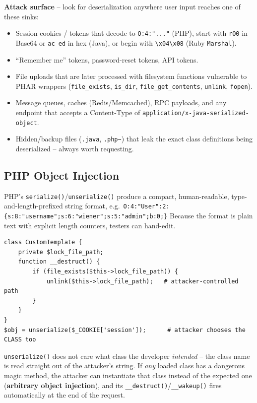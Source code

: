 \documentclass[11pt]{article}
\begin{document}
\textbf{Attack surface} -- look for deserialization anywhere user input reaches one of these sinks:
\begin{itemize}
    \item Session cookies / tokens that decode to \verb|O:4:"..."| (PHP), start with \texttt{rO0} in Base64 or \texttt{ac ed} in hex (Java), or begin with \verb|\x04\x08| (Ruby \texttt{Marshal}).
    \item ``Remember me'' tokens, password-reset tokens, API tokens.
    \item File uploads that are later processed with filesystem functions vulnerable to PHAR wrappers (\texttt{file\_exists}, \texttt{is\_dir}, \texttt{file\_get\_contents}, \texttt{unlink}, \texttt{fopen}).
    \item Message queues, caches (Redis/Memcached), RPC payloads, and any endpoint that accepts a Content-Type of \texttt{application/x-java-serialized-object}.
    \item Hidden/backup files (\texttt{.java}, \texttt{.php\~{}}) that leak the exact class definitions being deserialized -- always worth requesting.
\end{itemize}

\subsection{PHP Object Injection}
PHP's \verb|serialize()|/\verb|unserialize()| produce a compact, human-readable, type-and-length-prefixed string format, e.g.\ \verb|O:4:"User":2:{s:8:"username";s:6:"wiener";s:5:"admin";b:0;}| Because the format is plain text with explicit length counters, testers can hand-edit.
\begin{causebox}
\begin{lstlisting}[style=code]
class CustomTemplate {
    private $lock_file_path;
    function __destruct() {
        if (file_exists($this->lock_file_path)) {
            unlink($this->lock_file_path);   # attacker-controlled path
        }
    }
}
$obj = unserialize($_COOKIE['session']);      # attacker chooses the CLASS too
\end{lstlisting}
\verb|unserialize()| does not care what class the developer \textit{intended} -- the class name is read straight out of the attacker's string. If \textit{any} loaded class has a dangerous magic method, the attacker can instantiate that class instead of the expected one (\textbf{arbitrary object injection}), and its \verb|__destruct()|/\verb|__wakeup()| fires automatically at the end of the request.
\end{causebox}
\end{document}
